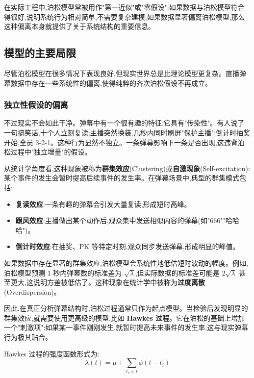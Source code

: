 \documentclass[12pt,a4paper]{article}
\begin{document}
在实际工程中,泊松模型常被用作"第一近似"或"零假设":如果数据与泊松模型符合得很好,说明系统行为相对简单,不需要复杂建模;如果数据显著偏离泊松模型,那么这种偏离本身就提供了关于系统结构的重要信息。

\subsection{模型的主要局限}

尽管泊松模型在很多情况下表现良好,但现实世界总是比理论模型更复杂。直播弹幕数据中存在一些系统性的偏离,使得纯粹的齐次泊松假设不再成立。

\subsubsection{独立性假设的偏离}

不过现实不会如此干净。弹幕中有一个很有趣的特征:它具有"传染性"。有人说了一句搞笑话,十个人立刻复读;主播突然换装,几秒内同时刷屏"保护主播";倒计时抽奖开始,全员 3-2-1。这种行为显然不独立。一条弹幕影响下一条是否出现,这违背泊松过程中"独立增量"的假设。

从统计学角度看,这种现象被称为\textbf{群集效应}(Clustering)或\textbf{自激现象}(Self-excitation):某个事件的发生会暂时提高后续事件的发生率。在弹幕场景中,典型的群集模式包括:
\begin{itemize}
\item \textbf{复读效应}:一条有趣的弹幕会引发大量复读,形成短时高峰。
\item \textbf{跟风效应}:主播做出某个动作后,观众集中发送相似内容的弹幕(如"666""哈哈哈")。
\item \textbf{倒计时效应}:在抽奖、PK 等特定时刻,观众同步发送弹幕,形成明显的峰值。
\end{itemize}

如果数据中存在显著的群集效应,泊松模型会系统性地低估短时波动的幅度。例如,泊松模型预测 1 秒内弹幕数的标准差为 $\sqrt{\lambda}$,但实际数据的标准差可能是 $2\sqrt{\lambda}$ 甚至更大,这说明方差被低估了。这种现象在统计学中被称为\textbf{过度离散}(Overdispersion)。

因此,在真正分析弹幕结构时,泊松过程通常只作为起点模型。当检验后发现明显的群集效应,就需要使用更高级的模型,比如 \textbf{Hawkes 过程}。它在泊松的基础上增加一个"刺激项":如果某一事件刚刚发生,就暂时提高未来事件的发生率,这与现实弹幕行为极其贴合。

Hawkes 过程的强度函数形式为:
\begin{equation}
\lambda(t) = \mu + \sum_{t_i < t} \phi(t - t_i)
\end{equation}
\end{document}
